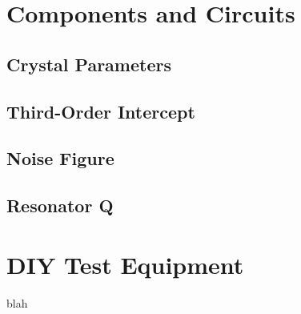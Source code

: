 \documentclass[10pt,letterpaper]{book}
\begin{document}
\chapter{Components and Circuits}
\section{Crystal Parameters}
\section{Third-Order Intercept}
\section{Noise Figure}
\section{Resonator Q}
\chapter{DIY Test Equipment}
blah
\end{document}
